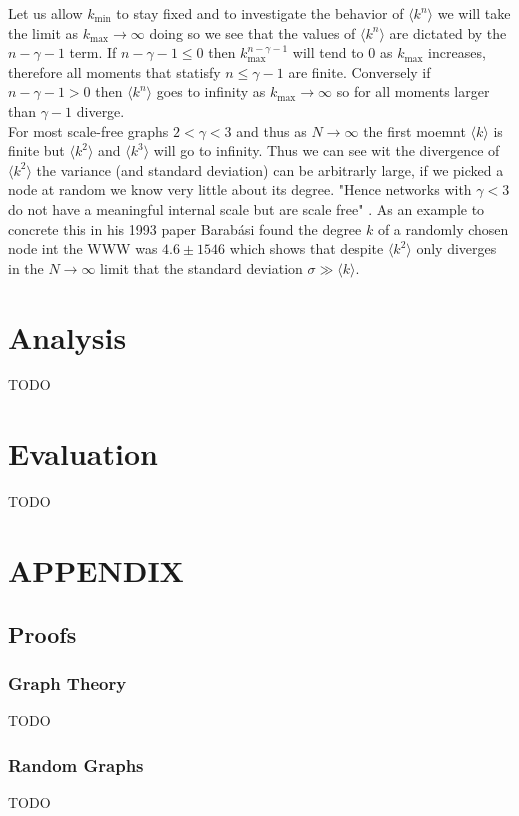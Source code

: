 \documentclass{article}
\begin{document}
        Let us allow $k_{\text{min}}$ to stay fixed and to investigate the behavior of $\langle k^n \rangle$ we will take the limit as $k_\text{max} \to \infty$ doing so we see that the values of $\langle k^n \rangle$ are dictated by the $n-\gamma -1$ term. If $n-\gamma -1 \leqslant 0$ then $k^{n-\gamma -1}_{\text{max}}$ will tend to $0$ as $k_\text{max}$ increases, therefore all moments that statisfy $n\leqslant \gamma-1$ are finite. Conversely if  $n-\gamma -1 > 0$  then $\langle k^n \rangle$ goes to infinity as $k_\text{max} \to \infty$ so for all moments larger than $\gamma-1$ diverge.\\ 
        For most scale-free graphs $2<\gamma<3$ and thus as $N\to \infty$ the first moemnt $\langle k \rangle$ is finite but $\langle k^2 \rangle$ and $\langle k^3 \rangle$ will go to infinity. Thus we can see wit the divergence of $\langle k^2 \rangle$ the variance (and standard deviation) can be arbitrarly large, if we picked a node at random we know very little about its degree. "Hence networks with $\gamma<3$ do not have a meaningful internal scale but are scale free" \parencite{barabasi2013network}. As an example to concrete this in his 1993 paper Barabási found the degree $k$ of a randomly chosen node int the WWW was $4.6 \pm 1546$ which shows that despite $\langle k^2 \rangle$ only diverges in the $N \to \infty$ limit that the standard deviation $\sigma \gg  \langle k \rangle$.

    \section{Analysis}
    TODO
    \section{Evaluation}
    TODO
    \section{APPENDIX}
        \subsection{Proofs}
            \subsubsection{Graph Theory}
            TODO
            \subsubsection{Random Graphs}
            TODO
\end{document}

